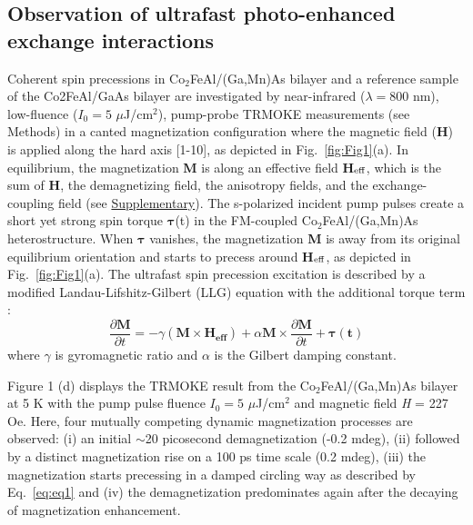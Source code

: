 \documentclass[%
 reprint,
superscriptaddress,
 amsmath,amssymb,
 aps,
prl,
]{revtex4-1}
\begin{document}
\subsection{Observation of ultrafast photo-enhanced exchange interactions}

Coherent spin precessions in Co$_2$FeAl/(Ga,Mn)As bilayer and a reference sample of the Co2FeAl/GaAs bilayer are investigated by near-infrared ($\lambda=800$ nm), low-fluence ($I_{0}=5$ $\mu$J/cm$^{2}$), pump-probe TRMOKE measurements (see Methods) in a canted magnetization configuration where the magnetic field (\textbf{H}) is applied along the hard axis [1-10], as depicted in Fig.~\ref{fig:Fig1}(a). In equilibrium, the magnetization \textbf{M} is along an effective field \textbf{H$_\textup{eff}$}, which is the sum of \textbf{H}, the demagnetizing field, the anisotropy fields, and the exchange-coupling field (see \hyperref[sec:Supplementary]{Supplementary}). The s-polarized incident pump pulses create a short yet strong spin torque $\mathbf{\tau}$(t) in the FM-coupled Co$_2$FeAl/(Ga,Mn)As heterostructure. When $\mathbf{\tau}$ vanishes, the magnetization \textbf{M} is away from its original equilibrium orientation and starts to precess around \textbf{H$_\textup{eff}$}, as depicted in Fig.~\ref{fig:Fig1}(a). The ultrafast spin precession excitation is described by a modified Landau-Lifshitz-Gilbert (LLG) equation with the additional torque term \cite{17}: 
\begin{equation}
    \frac{\partial \mathbf{M}}{\partial t}=-\gamma \left ( \mathbf{M} \times \mathbf{H_{eff}}\right )+\alpha \mathbf{M}\times \frac{\partial \mathbf{M}}{\partial t}+\mathbf{\tau(t)}
    \label{eq:eq1}
\end{equation}
where $\gamma$ is gyromagnetic ratio and $\alpha$ is the Gilbert damping constant.

Figure 1 (d) displays the TRMOKE result from the Co$_2$FeAl/(Ga,Mn)As bilayer at 5 K with the pump pulse fluence $I_{0}=5$ $\mu$J/cm$^{2}$ and magnetic field \textit{H} = 227 Oe. Here, four mutually competing dynamic magnetization processes are observed: (i) an initial $\sim$20 picosecond demagnetization (-0.2 mdeg), (ii) followed by a distinct magnetization rise on a 100 ps time scale (0.2 mdeg), (iii) the magnetization starts precessing in a damped circling way as described by Eq.~\ref{eq:eq1} and (iv) the demagnetization predominates again after the decaying of magnetization enhancement. 
\end{document}
